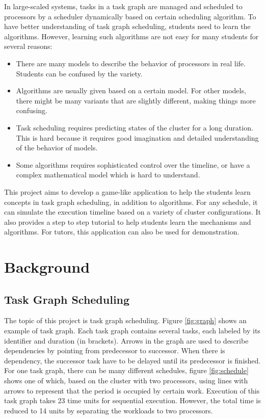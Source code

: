 \documentclass[msc,deptreport, cs]{infthesis}
\begin{document}
In large-scaled systems, tasks in a task graph are managed and scheduled to processors by a scheduler dynamically based on certain scheduling algorithm. To have better understanding of task graph scheduling, students need to learn the algorithms. However, learning such algorithms are not easy for many students for several reasons:

\begin{itemize}
  \item There are many models to describe the behavior of processors in real life. Students can be confused by the variety.
  \item Algorithms are usually given based on a certain model. For other models, there might be many variants that are slightly different, making things more confusing.
  \item Task scheduling requires predicting states of the cluster for a long duration. This is hard because it requires good imagination and detailed understanding of the behavior of models.
  \item Some algorithms requires sophisticated control over the timeline, or have a complex mathematical model which is hard to understand.
\end{itemize}

This project aims to develop a game-like application to help the students learn concepts in task graph scheduling, in addition to algorithms. For any schedule, it can simulate the execution timeline based on a variety of cluster configurations. It also provides a step to step tutorial to help students learn the mechanisms and algorithms. For tutors, this application can also be used for demonstration.

\chapter{Background}

\section{Task Graph Scheduling} \label{sec:tgs}

The topic of this project is task graph scheduling. Figure \ref{fig:graph} shows an example of task graph. Each task graph contains several tasks, each labeled by its identifier and duration (in brackets). Arrows in the graph are used to describe dependencies by pointing from predecessor to successor. When there is dependency, the successor task have to be delayed until its predecessor is finished. For one task graph, there can be many different schedules, figure \ref{fig:schedule} shows one of which, based on the cluster with two processors, using lines with arrows to represent that the period is occupied by certain work. Execution of this task graph takes 23 time units for sequential execution. However, the total time is reduced to 14 units by separating the workloads to two processors.
\end{document}
